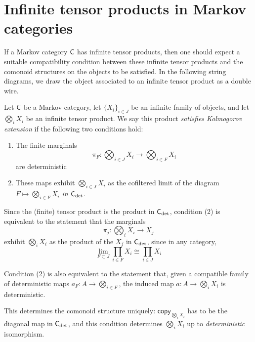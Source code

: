 \documentclass[11pt]{article}
\begin{document}
\section{Infinite tensor products in Markov categories}

If a Markov category $\mathsf{C}$ has infinite tensor products, then one should expect a suitable compatibility condition between these infinite tensor products and the comonoid structures on the objects to be satisfied. In the following string diagrams, we draw the object associated to an infinite tensor product as a double wire.

\begin{definition}
    \label{defn_kolmogorov_ext}
    Let $\mathsf{C}$ be a Markov category, let $\{X_i\}_{i\in J}$ be an infinite family of objects, and let $\bigotimes_i X_i$ be an infinite tensor product.
    We say this product \emph{satisfies Kolmogorov extension} if the following two conditions hold:
    \begin{enumerate}[(1)]
        \item The finite marginals \[\pi_F: \bigotimes_{i\in J} X_i \to \bigotimes_{i \in F} X_i\] are deterministic
        \item These maps exhibit $\bigotimes_{i\in J} X_i$ as the cofiltered limit of the diagram $F \mapsto \bigotimes_{i \in F} X_i$ \emph{in $\mathsf{C}_{\rm det}$}.
    \end{enumerate}
\end{definition}



\begin{remark}
    Since the (finite) tensor product is the product in $\mathsf{C}_{\rm det}$, condition (2) is equivalent to the statement that the marginals
    \[\pi_j: \bigotimes_i X_i \to X_j\]
    exhibit $\bigotimes_i X_i$ as the product of the $X_j$ in $\mathsf{C}_{\rm det}$,
    since in any category, \[\lim_{F \subset J} \prod_{i \in F}X_i \cong \prod_{i \in J}X_i\]
\end{remark}

\begin{remark}
    Condition (2) is also equivalent to the statement that, given a compatible family of deterministic maps $a_F: A \to \bigotimes_{i \in F}$, the induced map $a: A \to \bigotimes_i X_i$ is deterministic.
\end{remark}


This determines the comonoid structure uniquely: $\mathsf{copy}_{\bigotimes_i X_i}$ has to be the diagonal map in $\mathsf{C}_{\rm det}$,
and this condition determines $\bigotimes_i X_i$ up to \emph{deterministic} isomorphism.
\end{document}
